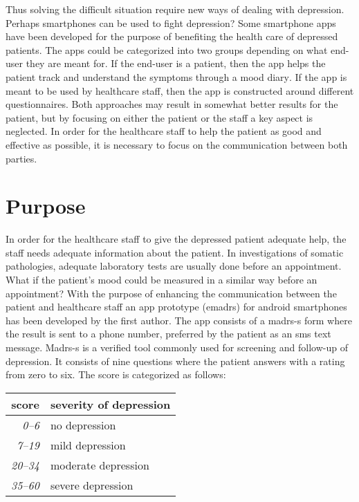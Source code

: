 \documentclass[12pt,a4paper,oneside]{article}
\let\oldcite\cite
\renewcommand*\cite[1]{\textsuperscript{\oldcite{#1}}}
\begin{document}
Thus solving the difficult situation require new ways of dealing with depression. Perhaps smartphones can be used to fight depression? Some smartphone apps have been developed for the purpose of benefiting the health care of depressed patients. The apps could be categorized into two groups depending on what end-user they are meant for. If the end-user is a patient, then the app helps the patient track and understand the symptoms through a mood diary\cite{app1}. If the app is meant to be used by healthcare staff, then the app is constructed around different questionnaires\cite{app2}. Both approaches may result in somewhat better results for the patient, but by focusing on either the patient or the staff a key aspect is neglected. In order for the healthcare staff to help the patient as good and effective as possible, it is necessary to focus on the communication between both parties.

\section*{Purpose}
In order for the healthcare staff to give the depressed patient adequate help, the staff needs adequate information about the patient. In investigations of somatic pathologies, adequate laboratory tests are usually done before an appointment. What if the patient's mood could be measured in a similar way before an appointment? With the purpose of enhancing the communication between the patient and healthcare staff an app prototype (e{\sc madrs}) for android smartphones has been developed by the first author\cite{emadrs1, emadrs2}. The app consists of a {\sc madrs-s} form where the result is sent to a phone number, preferred by the patient as an {\sc sms} text message. {\sc Madrs-s} is a verified tool commonly used for screening and follow-up of depression\cite{madrs2,madrs3}. It consists of nine questions where the patient answers with a rating from zero to six. The score is categorized as follows:\\

\begin{tabular}{r|l}
{\bf score} & {\bf severity of depression}\\
\hline{\it 0--6} &  no depression\\
{\it 7--19} & mild depression\\
{\it 20--34} & moderate depression\\
{\it 35--60} & severe depression\\
\end{tabular}\\\\
\end{document}

